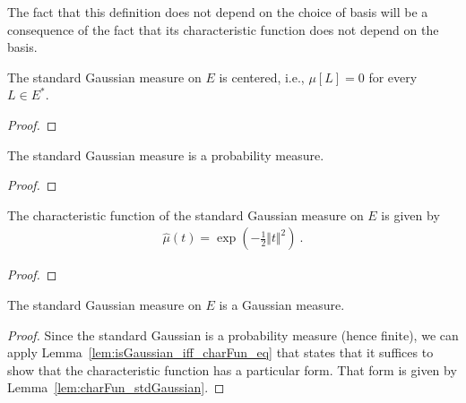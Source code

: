 The fact that this definition does not depend on the choice of basis will be a consequence of the fact that its characteristic function does not depend on the basis.

\begin{lemma}\label{lem:isCentered_stdGaussian}
The standard Gaussian measure on $E$ is centered, i.e., $\mu[L] = 0$ for every $L \in E^*$.
\end{lemma}

\begin{proof}

\end{proof}


\begin{lemma}\label{lem:isProbabilityMeasure_stdGaussian}
  \leanok
The standard Gaussian measure is a probability measure.
\end{lemma}

\begin{proof}\leanok

\end{proof}


\begin{lemma}\label{lem:charFun_stdGaussian}
The characteristic function of the standard Gaussian measure on $E$ is given by
\begin{align*}
  \hat{\mu}(t) = \exp\left(-\frac{1}{2} \Vert t \Vert^2 \right) \: .
\end{align*}
\end{lemma}

\begin{proof}

\end{proof}


\begin{lemma}\label{lem:isGaussian_stdGaussian}
  \leanok
The standard Gaussian measure on $E$ is a Gaussian measure.
\end{lemma}

\begin{proof}
Since the standard Gaussian is a probability measure (hence finite), we can apply Lemma~\ref{lem:isGaussian_iff_charFun_eq} that states that it suffices to show that the characteristic function has a particular form.
That form is given by Lemma~\ref{lem:charFun_stdGaussian}.
\end{proof}



